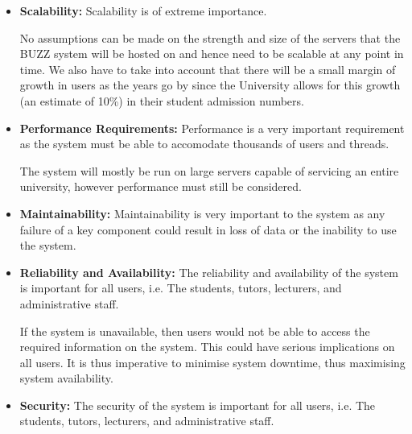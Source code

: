 
\begin{flushleft}
	\begin{itemize}
		\item \textbf{Scalability:} 
Scalability is of extreme importance.
\newline

No assumptions can be made on the strength and size of the servers that the BUZZ system will be hosted on and hence need to be scalable at any point in time. We also have to take into account that there will be a small margin of growth in users as the years go by since the University allows for this growth (an estimate of 10\%) in their student admission numbers.
\newline

		\item \textbf{Performance Requirements:} 
Performance is a very important requirement as the system must be able to accomodate thousands of users and threads.
\newline

The system will mostly be run on large servers capable of servicing an entire university, however performance must still be considered.
\newline

		\item \textbf{Maintainability:} 
Maintainability is very important to the system as any failure of a key component could result in loss of data or the inability to use the system.
\newline

		\item \textbf{Reliability and Availability:} 
The reliability and availability of the system is important for all users, i.e. The students, tutors, lecturers, and administrative staff.
\newline

If the system is unavailable, then users would not be able to access the required information on the system. This could have serious implications on all users. It is thus imperative to minimise system downtime, thus maximising system availability.\newline	
		
		\item \textbf{Security:} 
The security of the system is important for all users, i.e. The students, tutors, lecturers, and administrative staff.
\newline


\end{itemize}
\end{flushleft}
